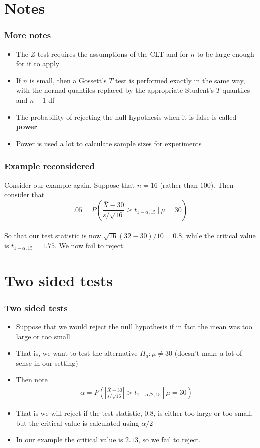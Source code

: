 \documentclass[aspectratio=169]{beamer}
\begin{document}
\section{Notes}
\begin{frame}\frametitle{More notes}
\begin{itemize}
\item The $Z$ test requires the assumptions of the CLT and for $n$ to be large enough
  for it to apply
\item If $n$ is small, then a Gossett's $T$ test is performed exactly in the same way,
  with the normal quantiles replaced by the appropriate Student's $T$ quantiles and
  $n-1$ df
\item The probability of rejecting the null hypothesis when it is false is called {\bf power}
\item Power is used a lot to calculate sample sizes for experiments
\end{itemize}
\end{frame} 


\begin{frame}\frametitle{Example reconsidered}
Consider our example again. Suppose that $n= 16$ (rather than
$100$). Then consider that \\
$$
.05 = P\left(\frac{\bar X - 30}{s / \sqrt{16}} \geq t_{1-\alpha, 15} ~|~ \mu = 30 \right)
$$ \ \\
So that our test statistic is now $\sqrt{16}(32 - 30) / 10 = 0.8 $, while the critical
value is $t_{1-\alpha, 15} = 1.75$. We now fail to reject.
\end{frame}

\section{Two sided tests}
\begin{frame}\frametitle{Two sided tests}
\begin{itemize}
\item Suppose that we would reject the null hypothesis if in fact the 
  mean was too large or too small
\item That is, we want to test the alternative $H_a : \mu \neq 30$
  (doesn't make a lot of sense in our setting)
\item Then note
  \begin{eqnarray*}
\alpha = P\left(\left. \left|\frac{\bar X - 30}{s /\sqrt{16}}\right| > t_{1-\alpha/2,15} ~\right|~ \mu = 30\right)
  \end{eqnarray*}
\item That is we will reject if the test statistic, $0.8$, is either
  too large or too small, but the critical value is calculated using
  $\alpha / 2$
\item In our example the critical value is $2.13$, so we fail to reject.
\end{itemize}
\end{frame}
\end{document}
